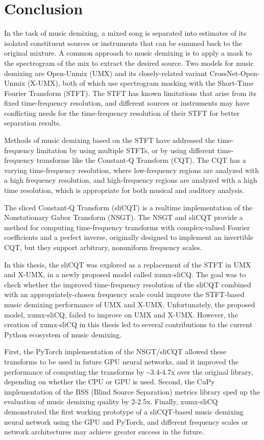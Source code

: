 \documentclass[report.tex]{subfiles}
\begin{document}
\section{Conclusion}
\label{sec:conclusion}

In the task of music demixing, a mixed song is separated into estimates of its isolated constituent sources or instruments that can be summed back to the original mixture. A common approach to music demixing is to apply a mask to the spectrogram of the mix to extract the desired source. Two models for music demixing are Open-Unmix (UMX) and its closely-related variant CrossNet-Open-Unmix (X-UMX), both of which use spectrogram masking with the Short-Time Fourier Transform (STFT). The STFT has known limitations that arise from its fixed time-frequency resolution, and different sources or instruments may have conflicting needs for the time-frequency resolution of their STFT for better separation results.

Methods of music demixing based on the STFT have addressed the time-frequency limitation by using multiple STFTs, or by using different time-frequency transforms like the Constant-Q Transform (CQT). The CQT has a varying time-frequency resolution, where low-frequency regions are analyzed with a high frequency resolution, and high-frequency regions are analyzed with a high time resolution, which is appropriate for both musical and auditory analysis.

The sliced Constant-Q Transform (sliCQT) is a realtime implementation of the Nonstationary Gabor Transform (NSGT). The NSGT and sliCQT provide a method for computing time-frequency transforms with complex-valued Fourier coefficients and a perfect inverse, originally designed to implement an invertible CQT, but they support arbitrary, nonuniform frequency scales.

In this thesis, the sliCQT was explored as a replacement of the STFT in UMX and X-UMX, in a newly proposed model called xumx-sliCQ. The goal was to check whether the improved time-frequency resolution of the sliCQT combined with an appropriately-chosen frequency scale could improve the STFT-based music demixing performance of UMX and X-UMX. Unfortunately, the proposed model, xumx-sliCQ, failed to improve on UMX and X-UMX. However, the creation of xumx-sliCQ in this thesis led to several contributions to the current Python ecosystem of music demixing.

First, the PyTorch implementation of the NSGT/sliCQT allowed these transforms to be used in future GPU neural networks, and it improved the performance of computing the transforms by \textasciitilde3.4-4.7x over the original library, depending on whether the CPU or GPU is used. Second, the CuPy implementation of the BSS (Blind Source Separation) metrics library sped up the evaluation of music demixing quality by 2-2.5x. Finally, xumx-sliCQ demonstrated the first working prototype of a sliCQT-based music demixing neural network using the GPU and PyTorch, and different frequency scales or network architectures may achieve greater success in the future.
\end{document}
